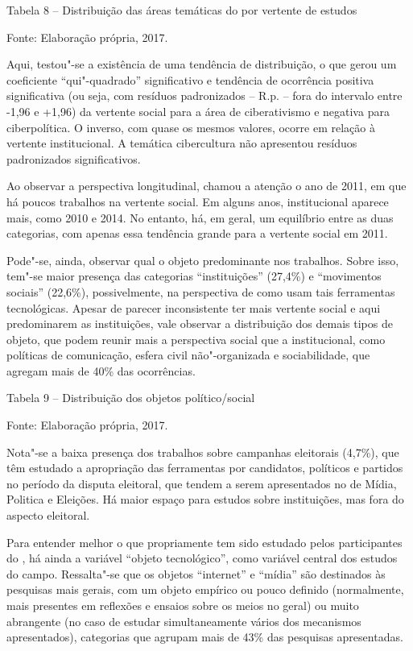 Tabela 8 -- Distribuição das áreas temáticas do  por vertente de
estudos

Fonte: Elaboração própria, 2017.

Aqui, testou"-se a existência de uma tendência de distribuição, o que
gerou um coeficiente ``qui"-quadrado'' significativo e tendência de
ocorrência positiva significativa (ou seja, com resíduos padronizados --
R.p. -- fora do intervalo entre -1,96 e +1,96) da vertente social para a
área de ciberativismo e negativa para ciberpolítica. O inverso, com
quase os mesmos valores, ocorre em relação à vertente institucional. A
temática cibercultura não apresentou resíduos padronizados
significativos.

Ao observar a perspectiva longitudinal, chamou a atenção o ano de 2011,
em que há poucos trabalhos na vertente social. Em alguns anos,
institucional aparece mais, como 2010 e 2014. No entanto, há, em geral,
um equilíbrio entre as duas categorias, com apenas essa tendência grande
para a vertente social em 2011.

Pode"-se, ainda, observar qual o objeto predominante nos trabalhos. Sobre
isso, tem"-se maior presença das categorias ``instituições'' (27,4\%) e
``movimentos sociais'' (22,6\%), possivelmente, na perspectiva de como
usam tais ferramentas tecnológicas. Apesar de parecer inconsistente ter
mais vertente social e aqui predominarem as instituições, vale observar
a distribuição dos demais tipos de objeto, que podem reunir mais a
perspectiva social que a institucional, como políticas de comunicação,
esfera civil não"-organizada e sociabilidade, que agregam mais de 40\%
das ocorrências.

Tabela 9 -- Distribuição dos objetos político/social


Fonte: Elaboração própria, 2017.

Nota"-se a baixa presença dos trabalhos sobre campanhas eleitorais
(4,7\%), que têm estudado a apropriação das ferramentas por candidatos,
políticos e partidos no período da disputa eleitoral, que tendem a serem
apresentados no  de Mídia, Politica e Eleições. Há maior espaço para
estudos sobre instituições, mas fora do aspecto eleitoral.

Para entender melhor o que propriamente tem sido estudado pelos
participantes do , há ainda a variável ``objeto tecnológico'', como
variável central dos estudos do campo. Ressalta"-se que os objetos
``internet'' e ``mídia'' são destinados às pesquisas mais gerais, com um
objeto empírico ou pouco definido (normalmente, mais presentes em
reflexões e ensaios sobre os meios no geral) ou muito abrangente (no
caso de estudar simultaneamente vários dos mecanismos apresentados),
categorias que agrupam mais de 43\% das pesquisas apresentadas.

